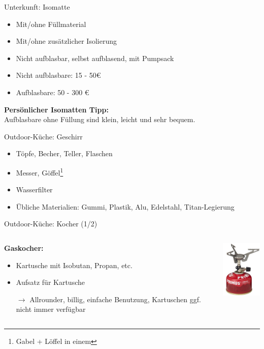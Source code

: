 \documentclass{beamer}
\newcommand{\sarrow}{\small$\rightarrow$}
\newcommand{\tipp}[2][Tipp]{\vspace{0.2cm}\textbf{#1:}\\#2}
\begin{document}
			\begin{frame}{Unterkunft: Isomatte}
				\begin{itemize}
					\item Mit/ohne Füllmaterial
					\item Mit/ohne zusätzlicher Isolierung
					\item Nicht aufblasbar, selbst aufblasend, mit Pumpsack
					\item Nicht aufblasbare: 15 - 50€
					\item Aufblasbare: 50 - 300 €
				\end{itemize}\pause
				\tipp[Persönlicher Isomatten Tipp]{Aufblasbare ohne Füllung sind klein, leicht und sehr bequem.}\\
			\end{frame}
			
			\begin{frame}{Outdoor-Küche: Geschirr}
				\begin{itemize}
					\item Töpfe, Becher, Teller, Flaschen
					\item Messer, Göffel\footnote{Gabel + Löffel in einem}
					\item Wasserfilter
					\item Übliche Materialien: Gummi, Plastik, Alu, Edelstahl, Titan-Legierung
				\end{itemize}
			\end{frame}
			
			\begin{frame}{Outdoor-Küche: Kocher (1/2)}
				\begin{columns}[c]
					\begin{column}{0.69\textwidth}
						\textbf{Gaskocher:}
						\begin{itemize}
							\item Kartusche mit Isobutan, Propan, etc.
							\item Aufsatz für Kartusche
							\item[\sarrow] Allrounder, billig, einfache Benutzung, Kartuschen ggf. nicht immer verfügbar
						\end{itemize}
					\end{column}
					\begin{column}{0.29\textwidth}
						\includegraphics[width=2.5cm]{images/kocher-gas.png}
					\end{column}
				\end{columns}
			\end{frame}
				
\end{document}
